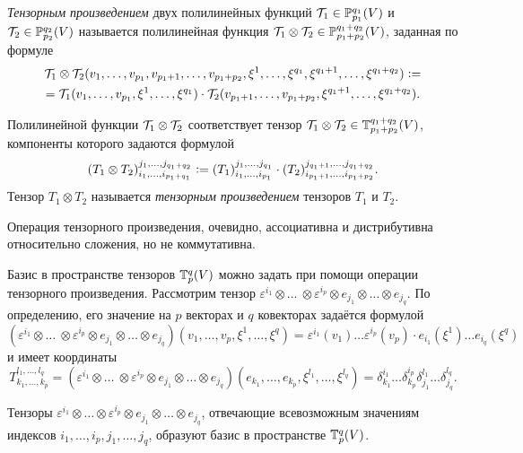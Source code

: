 \begin{definition}
    \textit{Тензорным произведением} двух полилинейных функций $\mathcal{T}_1 \in \mathbb{P}_{p_1}^{q_1}(V)$ и $\mathcal{T}_2 \in \mathbb{P}_{p_2}^{q_2}(V)$ называется полилинейная функция $\mathcal{T}_1 \otimes \mathcal{T}_2 \in \mathbb{P}_{p_1 + p_2}^{q_1 + q_2}(V)$, заданная по формуле
    \begin{multline*}
        \mathcal{T}_1 \otimes \mathcal{T}_2(v_1, \ldots, v_{p_1}, v_{p_1 + 1}, \ldots, v_{p_1 + p_2}, \xi^1, \ldots, \xi^{q_1}, \xi^{q_1 + 1}, \ldots, \xi^{q_1 + q_2}) \vcentcolon =\\ = \mathcal{T}_1(v_1, \ldots, v_{p_1}, \xi^1, \ldots, \xi^{q_1}) \cdot \mathcal{T}_2(v_{p_1 + 1}, \ldots, v_{p_1 + p_2}, \xi^{q_1 + 1}, \ldots, \xi^{q_1 + q_2}).
    \end{multline*}
\end{definition}

Полилинейной функции $\mathcal{T}_1 \otimes \mathcal{T}_2$ соответствует тензор $\mathcal{T}_1 \otimes \mathcal{T}_2 \in \mathbb{T}_{p_1 + p_2}^{q_1 + q_2}(V)$, компоненты которого задаются формулой
\[
    (T_1 \otimes T_2)_{i_1, \ldots, i_{p_1 + q_1}}^{j_1, \ldots, j_{q_1 + q_2}} \vcentcolon = (T_1)_{i_1, \ldots, i_{p_1}}^{j_1, \ldots, j_{q_1}} \cdot (T_2)_{i_{p_1 + 1}, \ldots, i_{p_1 + p_2}}^{j_{q_1 + 1}, \ldots, j_{q_1 + q_2}}.
\]
Тензор $T_1 \otimes T_2$ называется \textit{тензорным произведением} тензоров $T_1$ и $T_2$.

Операция тензорного произведения, очевидно, ассоциативна и дистрибутивна относительно сложения, но не коммутативна.

Базис в пространстве тензоров $\mathbb{T}_p^q(V)$ можно задать при помощи операции тензорного произведения. Рассмотрим тензор $\varepsilon^{i_1} \otimes \ldots\ \otimes \varepsilon^{i_p} \otimes e_{j_1} \otimes \ldots \otimes e_{j_q}$. По определению, его значение на $p$ векторах и $q$ ковекторах задаётся формулой
\[
    (\varepsilon^{i_1} \otimes \ldots\ \otimes \varepsilon^{i_p} \otimes e_{j_1} \otimes \ldots \otimes e_{j_q})(v_1, \ldots, v_p, \xi^1, \ldots, \xi^q) = \varepsilon^{i_1}(v_1) \ldots \varepsilon^{i_p}(v_p) \cdot e_{i_1}(\xi^1) \ldots e_{i_q}(\xi^q)
\]
и имеет координаты
\[
    T_{k_1, \ldots, k_p}^{l_1, \ldots, l_q} = (\varepsilon^{i_1} \otimes \ldots\ \otimes \varepsilon^{i_p} \otimes e_{j_1} \otimes \ldots \otimes e_{j_q})(e_{k_1}, \ldots, e_{k_p}, \xi^{l_1}, \ldots, \xi^{l_q}) = \delta_{k_1}^{i_1}\ldots\delta_{k_p}^{i_p}\delta_{j_1}^{l_1}\ldots\delta_{j_q}^{l_q}.
\]

\begin{theorem}
    Тензоры $\varepsilon^{i_1} \otimes \ldots \otimes \varepsilon^{i_p} \otimes e_{j_1} \otimes \ldots \otimes e_{j_q}$, отвечающие всевозможным значениям индексов $i_1, \ldots, i_p, j_1, \ldots, j_q$, образуют базис в пространстве $\mathbb{T}_p^q(V)$.
\end{theorem}

